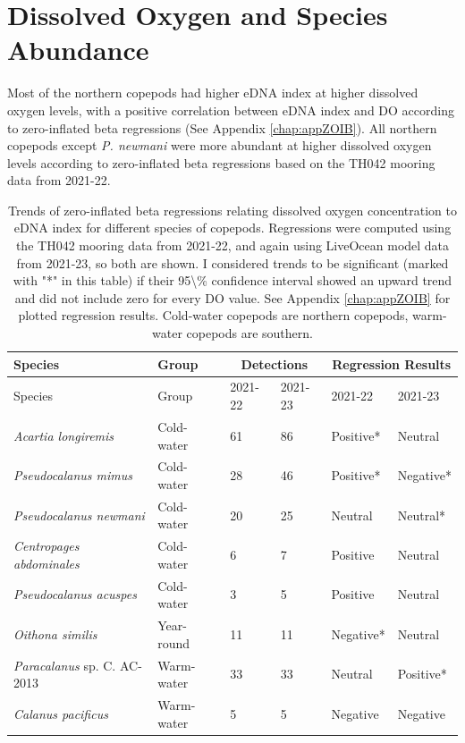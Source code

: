 \documentclass[12pt,twoside]{reedthesis}
\begin{document}
	
	\section{Dissolved Oxygen and Species Abundance}  
	
	Most of the northern copepods had higher eDNA index at higher dissolved oxygen levels, with a positive correlation between eDNA index and DO according to zero-inflated beta regressions (See Appendix \ref{chap:appZOIB}). All northern copepods except \textit{P. newmani} were more abundant at higher dissolved oxygen levels according to zero-inflated beta regressions based on the TH042 mooring data from 2021-22.
	
	\begin{table}[!h] 
			\begin{tabular}{l | l | l l | l l}
				\toprule
				Species & Group & \multicolumn{2}{|c|}{Detections} & \multicolumn{2}{|c}{Regression Results} \tabularnewline
				\midrule
				Species &  Group & 2021-22 & 2021-23 & 2021-22 & 2021-23  \\ 
				\midrule 
				\textit{Acartia longiremis}	& Cold-water & 61 & 86 & Positive* & Neutral  \\
				\textit{Pseudocalanus mimus} & Cold-water & 28  & 46 & Positive* & Negative*  \\
				\textit{Pseudocalanus newmani}	& Cold-water & 20  & 25 & Neutral & Neutral* \\
				\textit{Centropages abdominales} & Cold-water & 6 & 7 & Positive & Neutral   \\
				\textit{Pseudocalanus acuspes}  & Cold-water & 3  & 5 & Positive & Neutral  \\
				\textit{Oithona similis} & Year-round & 11  & 11 & Negative* & Neutral \\
				\textit{Paracalanus} sp. C. AC-2013 & Warm-water & 33  & 33 & Neutral & Positive*  \\
				\textit{Calanus pacificus}	& Warm-water & 5  & 5 & Negative & Negative  \\
				\bottomrule 
			\end{tabular}
			\label{ZOIBtab}
			\caption[Zero-inflated beta regression results]{Trends of zero-inflated beta regressions relating dissolved oxygen concentration to eDNA index for different species of copepods. Regressions were computed using the TH042 mooring data from 2021-22, and again using LiveOcean model data from 2021-23, so both are shown. I considered trends to be significant (marked with "*" in this table) if their 95\textbackslash{}\% confidence interval showed an upward trend and did not include zero for every DO value. See Appendix \ref{chap:appZOIB} for plotted regression results. Cold-water copepods are northern copepods, warm-water copepods are southern.}  
	\end{table}
	
\end{document}
